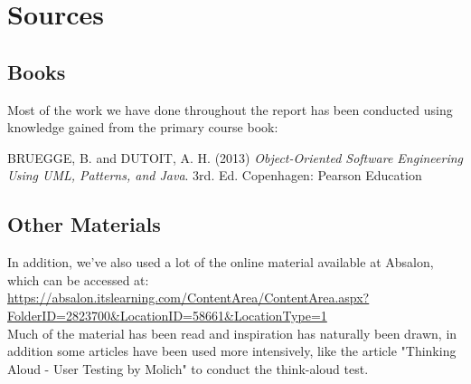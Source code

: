 \documentclass[12pt,a4paper]{article}
\begin{document}
	\newpage
\section{Sources}
\subsection{Books}
Most of the work we have done throughout the report has been conducted using knowledge gained from the primary course book:

BRUEGGE, B. and DUTOIT, A. H. (2013) \textit{Object-Oriented Software Engineering Using UML, Patterns, and Java}. 3rd. Ed. Copenhagen: Pearson Education
\subsection{Other Materials}
In addition, we've also used a lot of the online material available at Absalon, which can be accessed at: \url{https://absalon.itslearning.com/ContentArea/ContentArea.aspx?FolderID=2823700&LocationID=58661&LocationType=1}\\

Much of the material has been read and inspiration has naturally been drawn, in addition some articles have been used more intensively, like the article "Thinking Aloud - User Testing by Molich" to conduct the think-aloud test.
\end{document}

